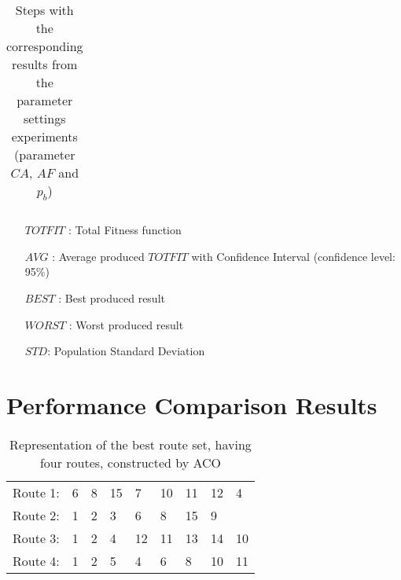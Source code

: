 \begin{table}
\begin{tabular}{|l|l|l|c||c|c|c|c|c|}
    \hline
    \end{tabular}
    \caption {Steps with the corresponding results from the parameter settings experiments (parameter $CA$, $AF$ and $p_b$)}
    \tiny
    \begin{itemize}[noitemsep]
    \item[$TOTFIT$ :] Total Fitness function
    \item[$AVG$ :] Average produced $TOTFIT$ with Confidence Interval (confidence level: 95\%)
    \item[$BEST$ :] Best produced result
    \item[$WORST$ :] Worst produced result
    \item[$STD$:] Population Standard Deviation 
    \end{itemize}
    \label{table:pm2}
\end{table}


\section{Performance Comparison Results}
\begin{table}[H]
    \centering
    \begin{tabular}{|l|llllllll|}
    \hline
    Route 1: & 6 & 8 & 15 & 7 & 10 & 11 & 12 & 4 \\
    Route 2: & 1 & 2 & 3 & 6 & 8 & 15 & 9 &  \\
    Route 3: & 1 & 2 & 4 & 12 & 11 & 13 & 14 & 10 \\
    Route 4: & 1 & 2 & 5 & 4 & 6 & 8 & 10 & 11 \\
    \hline
    \end{tabular}
    \caption {Representation of the best route set, having four routes, constructed by ACO}
    \label{table:performanceComparison_bestRouteSet4_ACO}
\end{table}

